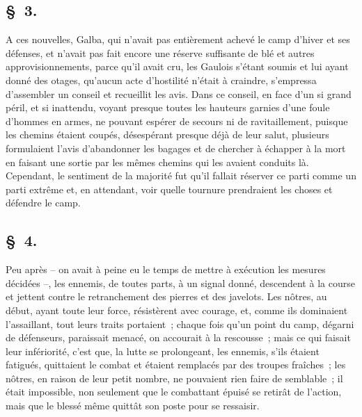 \documentclass[french,twoside]{book} %
\begin{document}
\subsection[{§ 3.}]{ \textsc{§ 3.} }
\noindent A ces nouvelles, Galba, qui n’avait pas entièrement achevé le camp d’hiver et ses défenses, et n’avait pas fait encore une réserve suffisante de blé et autres approvisionnements, parce qu’il avait cru, les Gaulois s’étant soumis et lui ayant donné des otages, qu’aucun acte d’hostilité n’était à craindre, s’empressa d’assembler un conseil et recueillit les avis. Dans ce conseil, en face d’un si grand péril, et si inattendu, voyant presque toutes les hauteurs garnies d’une foule d’hommes en armes, ne pouvant espérer de secours ni de ravitaillement, puisque les chemins étaient coupés, désespérant presque déjà de leur salut, plusieurs formulaient l’avis d’abandonner les bagages et de chercher à échapper à la mort en faisant une sortie par les mêmes chemins qui les avaient conduits là. Cependant, le sentiment de la majorité fut qu’il fallait réserver ce parti comme un parti extrême et, en attendant, voir quelle tournure prendraient les choses et défendre le camp.
\subsection[{§ 4.}]{ \textsc{§ 4.} }
\noindent Peu après – on avait à peine eu le temps de mettre à exécution les mesures décidées –, les ennemis, de toutes parts, à un signal donné, descendent à la course et jettent contre le retranchement des pierres et des javelots. Les nôtres, au début, ayant toute leur force, résistèrent avec courage, et, comme ils dominaient l’assaillant, tout leurs traits portaient ; chaque fois qu’un point du camp, dégarni de défenseurs, paraissait menacé, on accourait à la rescousse ; mais ce qui faisait leur infériorité, c’est que, la lutte se prolongeant, les ennemis, s’ils étaient fatigués, quittaient le combat et étaient remplacés par des troupes fraîches ; les nôtres, en raison de leur petit nombre, ne pouvaient rien faire de semblable ; il était impossible, non seulement que le combattant épuisé se retirât de l’action, mais que le blessé même quittât son poste pour se ressaisir.
\end{document}

